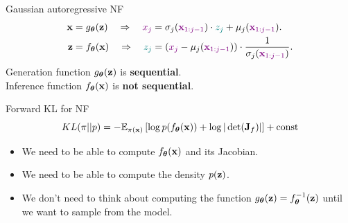 \begin{frame}{Gaussian autoregressive NF}
	\vspace{-0.5cm}
	\begin{align*}
		\mathbf{x} &= g_{\boldsymbol{\theta}}(\mathbf{z}) \quad \Rightarrow \quad {\color{violet} x_j} = \sigma_j ({\color{violet} \mathbf{x}_{1:j-1}}) \cdot {\color{teal} z_j} + \mu_j({\color{violet} \mathbf{x}_{1:j-1}}). \\
		\mathbf{z} &= f_{\boldsymbol{\theta}}(\mathbf{x}) \quad \Rightarrow \quad {\color{teal} z_j} = \left({\color{violet}x_j} - \mu_j({\color{violet}\mathbf{x}_{1:j-1}}) \right) \cdot \frac{1}{ \sigma_j ({\color{violet}\mathbf{x}_{1:j-1}})}.
	\end{align*}
	Generation function $g_{\boldsymbol{\theta}}(\mathbf{z})$ is \textbf{sequential}. \\ Inference function $f_{\boldsymbol{\theta}}(\mathbf{x})$ is \textbf{not sequential}.

	\begin{block}{Forward KL for NF}
		\vspace{-0.2cm}
		\[
			KL(\pi || p)  = - \mathbb{E}_{\pi(\mathbf{x})} \left[\log p(f_{\boldsymbol{\theta}}(\mathbf{x})) + \log  |\det (\mathbf{J}_f)|\right] + \text{const} 
		\]
		\vspace{-0.5cm}
		\begin{itemize}
			\item We need to be able to compute $f_{\boldsymbol{\theta}}(\mathbf{x})$ and its Jacobian.
			\item We need to be able to compute the density $p(\mathbf{z})$.
			\item We don’t need to think about computing the function $g_{\boldsymbol{\theta}}(\mathbf{z}) = f_{\boldsymbol{\theta}}^{-1}(\mathbf{z})$ until we want to sample from the model.
		\end{itemize}
	\end{block}
\end{frame}
